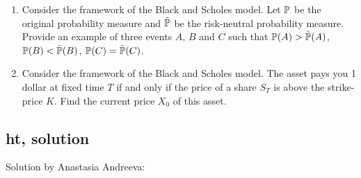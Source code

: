 \documentclass[12pt, a4paper]{article}
\begin{document}
\begin{enumerate}
\item Consider the framework of the Black and Scholes model. Let $\P$ be the original probability measure and $\tilde{\P}$ be the risk-neutral probability measure. Provide an example of three events $A$, $B$ and $C$ such that $\P(A) > \tilde{\P}(A)$,  $\P(B) < \tilde{\P}(B)$, $\P(C) = \tilde{\P}(C)$.

\item Consider the framework of the Black and Scholes model. The asset pays you 1 dollar at fixed time $T$ if and only if the price of a share $S_T$ is above the strike-price $K$. Find the current price $X_0$ of this asset.

\end{enumerate}


\subsection{ht, solution}

Solution by Anastasia Andreeva:
\end{document}
